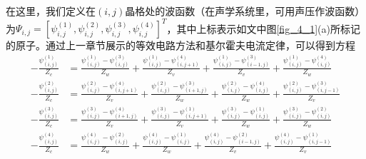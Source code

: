 在这里，我们定义在$(i,j)$晶格处的波函数（在声学系统里，可用声压作波函数）为$\Psi_{i,j} = [\psi_{i,j}^{(1)}, \psi_{i,j}^{(2)}, \psi_{i,j}^{(3)}, \psi_{i,j}^{(4)}]^T$，其中上标表示如文中图\ref{fig_4_1}(a)所标记的原子。通过上一章节展示的等效电路方法和基尔霍夫电流定律，可以得到方程
\begin{equation}
    \begin{aligned}
    -\frac{\psi_{(i,j)}^{(1)}}{Z_c} &= \frac{\psi_{(i,j)}^{(1)} - \psi_{(i,j)}^{(3)}}{Z_w} + \frac{\psi_{(i,j)}^{(1)} - \psi_{(i,j + 1)}^{(4)}}{Z_v} + \frac{\psi_{(i,j)}^{(1)} - \psi_{(i - 1,j)}^{(3)}}{Z_v} + \frac{\psi_{(i,j)}^{(1)} - \psi_{(i,j)}^{(4)}}{Z_w} \\
    -\frac{\psi_{(i,j)}^{(2)}}{Z_c} &= \frac{\psi_{(i,j)}^{(2)} - \psi_{(i,j + 1)}^{(4)}}{Z_v} + \frac{\psi_{(i,j)}^{(2)} - \psi_{(i + 1,j)}^{(3)}}{Z_w} + \frac{\psi_{(i,j)}^{(2)} - \psi_{(i,j)}^{(4)}}{Z_w} + \frac{\psi_{(i,j)}^{(2)} - \psi_{(i,j - 1)}^{(3)}}{Z_v} \\
    -\frac{\psi_{(i,j)}^{(3)}}{Z_c} &= \frac{\psi_{(i,j)}^{(3)} - \psi_{(i + 1,j)}^{(4)}}{Z_v} + \frac{\psi_{(i,j)}^{(3)} - \psi_{(i,j + 1)}^{(1)}}{Z_v} + \frac{\psi_{(i,j)}^{(3)} - \psi_{(i,j)}^{(1)}}{Z_w} + \frac{\psi_{(i,j)}^{(3)} - \psi_{(i,j)}^{(2)}}{Z_w} \\
    -\frac{\psi_{(i,j)}^{(4)}}{Z_c} &= \frac{\psi_{(i,j)}^{(4)} - \psi_{(i,j)}^{(2)}}{Z_w} + \frac{\psi_{(i,j)}^{(4)} - \psi_{(i,j)}^{(1)}}{Z_w} + \frac{\psi_{(i,j)}^{(4)} - \psi_{(i - 1,j)}^{(2)}}{Z_v} + \frac{\psi_{(i,j)}^{(4)} - \psi_{(i,j - 1)}^{(1)}}{Z_v}
    \end{aligned}
    \label{eq4-1}
\end{equation}

